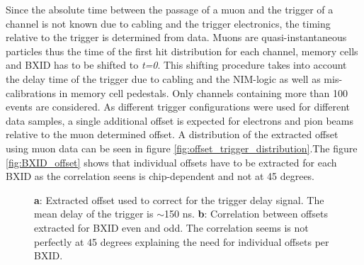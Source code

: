 \documentclass[twoside,a4paper,11pt]{article}
\begin{document}
Since the absolute time between the passage of a muon and the trigger of a channel is not known due to cabling and the trigger electronics, the timing relative to the trigger is determined from data. Muons are quasi-instantaneous particles thus the time of the first hit distribution for each channel, memory cells and BXID has to be shifted to \textit{t=0}. This shifting procedure takes into account the delay time of the trigger due to cabling and the NIM-logic as well as mis-calibrations in memory cell pedestals. Only channels containing more than 100 events are considered. As different trigger configurations were used for different data samples, a single additional offset is expected for electrons and pion beams relative to the muon determined offset. A distribution of the extracted offset using muon data can be seen in figure \ref{fig:offset_trigger_distribution}.The figure \ref{fig:BXID_offset} shows that individual offsets have to be extracted for each BXID as the correlation seens is chip-dependent and not at 45 degrees.\\
\begin{figure}[htbp]
	\hfill
	\hfill
	\caption[]{\textbf{a}: Extracted offset used to correct for the trigger delay signal. The mean delay of the trigger is $\sim$150 ns. \textbf{b}: Correlation between offsets extracted for BXID even and odd. The correlation seems is not perfectly at 45 degrees explaining the need for individual offsets per BXID.}
\end{figure}
\end{document}
